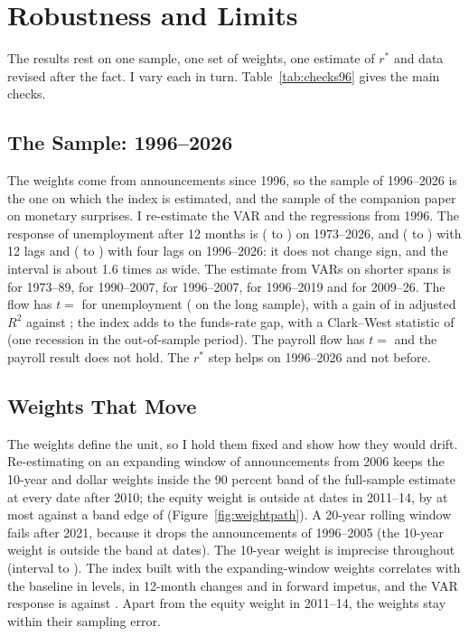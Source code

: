 \documentclass[11pt]{article}
\newcommand{\rs}{r^{*}}
\begin{document}
\section{Robustness and Limits}\label{sec:rob}
The results rest on one sample, one set of weights, one estimate of $\rs$ and data revised after the fact. I vary each in turn. Table~\ref{tab:checks96} gives the main checks.

\subsection{The Sample: 1996--2026}\label{sec:sample96}
The weights come from announcements since 1996, so the sample of 1996--2026 is the one on which the index is estimated, and the sample of the companion paper on monetary surprises. I re-estimate the VAR and the regressions from 1996. The response of unemployment after 12 months is  ( to ) on 1973--2026, and  ( to ) with 12 lags and  ( to ) with four lags on 1996--2026: it does not change sign, and the interval is about 1.6 times as wide. The estimate from VARs on shorter spans is  for 1973--89,  for 1990--2007,  for 1996--2007,  for 1996--2019 and  for 2009--26. The flow has $t=$  for unemployment ( on the long sample), with a gain of  in adjusted $R^2$ against ; the index adds  to the funds-rate gap, with a Clark--West statistic of  (one recession in the out-of-sample period). The payroll flow has $t=$  and the payroll result does not hold. The $\rs$ step helps on 1996--2026 and not before.



\subsection{Weights That Move}\label{sec:drift}
The weights define the unit, so I hold them fixed and show how they would drift. Re-estimating on an expanding window of announcements from 2006 keeps the 10-year and dollar weights inside the 90 percent band of the full-sample estimate at every date after 2010; the equity weight is outside at  dates in 2011--14, by at most  against a band edge of  (Figure~\ref{fig:weightpath}). A 20-year rolling window fails after 2021, because it drops the announcements of 1996--2005 (the 10-year weight is outside the band at  dates). The 10-year weight is imprecise throughout (interval  to ). The index built with the expanding-window weights correlates  with the baseline in levels,  in 12-month changes and  in forward impetus, and the VAR response is  against . Apart from the equity weight in 2011--14, the weights stay within their sampling error.
\end{document}
